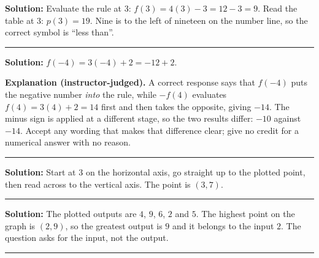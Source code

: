 \documentclass[12pt]{article}
\begin{document}

\textbf{Solution:} \quad Evaluate the rule at $3$: $f(3) = 4(3) - 3 = 12 - 3 = 9$.
Read the table at $3$: $p(3) = 19$. Nine is to the left of nineteen on the number line, so the
correct symbol is ``less than''. 

\vspace{0.25cm}

\noindent\rule{\linewidth}{0.2pt}


\textbf{Solution:} \quad $f(-4) = 3(-4) + 2 = -12 + 2$. 

\textbf{Explanation (instructor-judged).} A correct response says that $f(-4)$ puts the
negative number \emph{into} the rule, while $-f(4)$ evaluates $f(4) = 3(4) + 2 = 14$ first and
then takes the opposite, giving $-14$. The minus sign is applied at a different stage, so the
two results differ: $-10$ against $-14$. Accept any wording that makes that difference clear;
give no credit for a numerical answer with no reason.

\vspace{0.25cm}

\noindent\rule{\linewidth}{0.2pt}


\textbf{Solution:} \quad Start at $3$ on the horizontal axis, go straight up to the plotted
point, then read across to the vertical axis. The point is $(3, 7)$. 

\vspace{0.25cm}

\noindent\rule{\linewidth}{0.2pt}


\textbf{Solution:} \quad The plotted outputs are $4$, $9$, $6$, $2$ and $5$. The highest point
on the graph is $(2, 9)$, so the greatest output is $9$ and it belongs to the input $2$. The
question asks for the input, not the output. 

\vspace{0.25cm}

\noindent\rule{\linewidth}{0.2pt}

\end{document}
